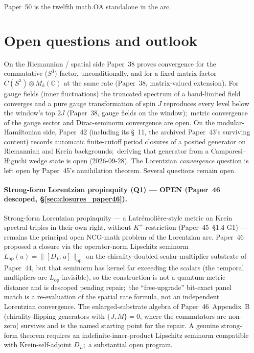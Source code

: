 \documentclass[11pt,a4paper]{article}
\theoremstyle{plain}
\theoremstyle{definition}
\newcommand{\sthree}{S^{3}}
\newcommand{\DL}{D_{L}}
\newcommand{\opnorm}[1]{\lVert #1 \rVert_{\mathrm{op}}}
\newcommand{\C}{\mathbb{C}}
\begin{document}
Paper~50 is the twelfth math.OA standalone in the arc.

\section{Open questions and outlook}
\label{sec:open}

On the Riemannian / spatial side Paper~38 proves convergence for the
commutative ($\sthree$) factor, unconditionally, and for a fixed matrix
factor $C(\sthree) \otimes M_k(\C)$ at the same rate (Paper~38,
matrix-valued extension). For gauge fields (inner fluctuations) the
truncated spectrum of a band-limited field converges and a pure gauge
transformation of spin $J$ reproduces every level below the window's
top $2J$ (Paper~38, gauge fields on the window);\ metric convergence of the gauge sector and Dirac-seminorm
convergence are open.  On the
modular-Hamiltonian side, Paper~42 (including its \S~11, the archived
Paper~43's surviving content) records automatic
finite-cutoff period closures of a posited generator on Riemannian and
Krein backgrounds;\ deriving that generator from a Camporesi--Higuchi
wedge state is open (2026-09-28).  The Lorentzian
\emph{convergence} question is left open by Paper~45's annihilation
theorem.  Several questions remain open.

\paragraph{Strong-form Lorentzian propinquity (Q1) --- OPEN
(Paper~46 descoped, \S\ref{sec:closures_paper46}).}
Strong-form Lorentzian propinquity --- a Latr\'emoli\`ere-style metric
on Krein spectral triples in their own right, without
$K^{+}$-restriction (Paper~45~\S 1.4 G1) --- remains the principal
open NCG-math problem of the Lorentzian arc.  Paper~46~\cite{paper46}
proposed a closure via the operator-norm Lipschitz seminorm
$L_{\mathrm{op}}(a) = \opnorm{[\DL, a]}$ on the chirality-doubled
scalar-multiplier substrate of Paper~44, but that seminorm has kernel
far exceeding the scalars (the temporal multipliers are
$L_{\mathrm{op}}$-invisible), so the construction is not a
quantum-metric distance and is descoped pending repair;\ the
``free-upgrade'' bit-exact panel match is a re-evaluation of the
spatial rate formula, not an independent Lorentzian convergence.  The
enlarged-substrate algebra of Paper~46~Appendix~B (chirality-flipping
generators with $\{J, M\} = 0$, where the commutators are non-zero)
survives and is the named starting point for the repair.  A genuine
strong-form theorem requires an indefinite-inner-product Lipschitz
seminorm compatible with Krein-self-adjoint $\DL$;\ a substantial
open program.
\end{document}

